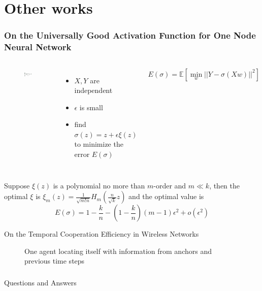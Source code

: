 \documentclass[notheorems]{beamer}
\begin{document}
\section{Other works}
\begin{frame}
	\frametitle{\small On the Universally Good Activation Function for One Node Neural Network}
	\begin{columns}
	\column{5cm}
	\begin{figure}
	\includegraphics[width=\textwidth]{./network_structure.eps}
	\end{figure}
	\column{5cm}
	\begin{itemize}
		\item $X,Y$ are independent
		\item  $\epsilon$ is small
		\item find $\sigma(z) = z + \epsilon \xi(z)$ to minimize the error $E(\sigma)$
	\end{itemize}
	$$
	E(\sigma)= \mathbb{E}[\min_{w} || Y - \sigma(X w) ||^2]
	$$
	\end{columns}
	\begin{theorem}
		Suppose $\xi(z)$ is a polynomial no more than $m$-order and $m\ll k$, then the optimal $\xi$ is $\xi_m(z) = \frac{1}{\sqrt{m! n}}H_m(\frac{n}{\sqrt{k}} z)$ and the optimal value is
		$$
		E(\sigma) = 1-\frac{k}{n}  - (1-\frac{k}{n})(m-1)  \epsilon^2 + o(\epsilon^2)
		$$
		\end{theorem}
\end{frame}
\begin{frame}{\large On the Temporal Cooperation Efficiency in Wireless Networks}
	\begin{figure}
		\centering
	  \def\svgwidth{7cm}
	  
	  \caption{One agent locating itself with information from anchors and previous time steps}
	  \label{f1}
	  \end{figure}
\end{frame}

\begin{frame}
	\frametitle{}
	\begin{block}{}
	\centering
	{\Huge Questions and Answers}
	\end{block}
\end{frame}
\end{document}
